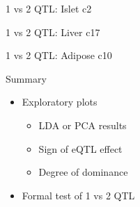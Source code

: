 \documentclass[12pt,t]{beamer}
\begin{document}
\begin{frame}[c]{1 vs 2 QTL: Islet c2}
\end{frame}

\begin{frame}[c]{1 vs 2 QTL: Liver c17}
\end{frame}

\begin{frame}[c]{1 vs 2 QTL: Adipose c10}
\end{frame}


\begin{frame}[c]{Summary}
  \begin{itemize}
  \itemsep18pt
  \item Exploratory plots
    \vspace*{12pt}
    \begin{itemize}
    \itemsep12pt
    \item LDA or PCA results
    \item Sign of eQTL effect
    \item Degree of dominance
    \end{itemize}
  \item Formal test of 1 vs 2 QTL
  \end{itemize}
\end{frame}
\end{document}
